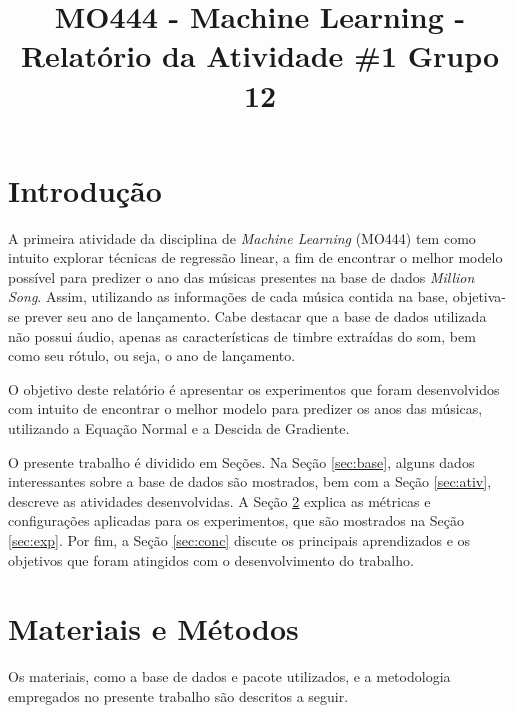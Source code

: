 \documentclass[conference]{IEEEtran}
\begin{document}
\title{MO444 - Machine Learning - Relatório da Atividade \#1 Grupo 12}

\author{
\and
{}
}

\maketitle

\section{Introdução}

A primeira atividade da disciplina de \textit{Machine Learning} (MO444) tem como intuito explorar técnicas de regressão linear, a fim de encontrar o melhor modelo possível para predizer o ano das músicas presentes na base de dados \textit{Million Song}. Assim, utilizando as informações de cada música contida na base, objetiva-se prever seu ano de lançamento. Cabe destacar que a base de dados utilizada não possui áudio, apenas as características de timbre extraídas do som, bem como seu rótulo, ou seja, o ano de lançamento.

O objetivo deste relatório é apresentar os experimentos que foram desenvolvidos com intuito de encontrar o melhor modelo para predizer os anos das músicas, utilizando a Equação Normal e a Descida de Gradiente.

O presente trabalho é dividido em Seções. Na Seção \ref{sec:base}, alguns dados interessantes sobre a base de dados são mostrados, bem com a Seção \ref{sec:ativ}, descreve as atividades desenvolvidas. A Seção \ref{sec:meto} explica as métricas e configurações aplicadas para os experimentos, que são mostrados na Seção \ref{sec:exp}. Por fim, a Seção \ref{sec:conc} discute os principais aprendizados e os objetivos que foram atingidos com o desenvolvimento do trabalho.

\section{Materiais e Métodos} \label{sec:meto}

Os materiais, como a base de dados e pacote utilizados, e a metodologia empregados no presente trabalho são descritos a seguir.
\end{document}
